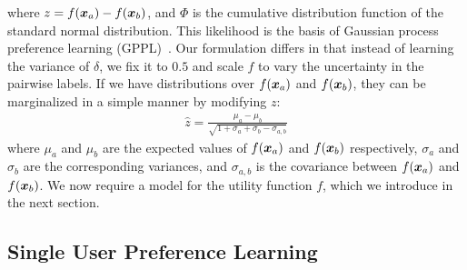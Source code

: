 where $z = f(\boldsymbol x_a) - f(\boldsymbol x_b)$,
and $\Phi$ is the cumulative distribution function of the standard normal distribution. 
This likelihood is the basis of Gaussian process preference learning (GPPL)~\citep{chu2005preference}. 
Our formulation differs in that instead of learning the variance of $\delta$, we fix it 
to $0.5$ and scale $f$ to vary the uncertainty in the pairwise labels.
If we have distributions over $f(\boldsymbol x_a)$ and $f(\boldsymbol x_b)$, they can be marginalized in a simple manner %
by modifying $z$:
\begin{align}
\hat{z} = \frac{\mu_a - \mu_b}{\sqrt{1 + \sigma_a + \sigma_b - \sigma_{a,b}} }
\end{align}
where $\mu_a$ and $\mu_b$ are the expected values of $f(\boldsymbol x_a)$ and $f(\boldsymbol x_b)$ respectively, 
$\sigma_a$ and $\sigma_b$ are the corresponding variances,
and $\sigma_{a,b}$ is the covariance between $f(\boldsymbol x_a)$ and $f(\boldsymbol x_b)$.
We now require a model for the utility function $f$, which we introduce in the next section.

\subsection{Single User Preference Learning}

